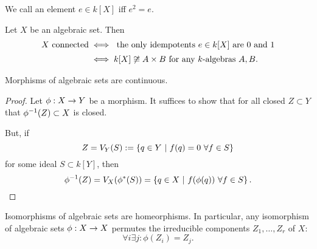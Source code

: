 \begin{lemma}
	We call an element $e \in k[X]$  iff $e^2 = e$.
	
	Let $X$ be an algebraic set. Then
	\begin{align*}
	X \text{ connected} &\iff \text{ the only idempotents }e \in k[X] \text{ are 0 and 1}\\
	&\iff k[X] \not\overset{}{\cong} A \times B \text{ for any }k\text{-algebras }A,B.
	\end{align*}
\end{lemma}
\begin{lemma}
	Morphisms of algebraic sets are continuous.
\end{lemma}
\begin{proof}
	Let $\phi : X \overset{}{\rightarrow} Y$ be a morphism.
	It suffices to show that for all closed $Z \subset Y$ that $\phi^{-1}(Z) \subset X$ is closed.
	
	But, if
	\[Z = V_Y(S) := \left\lbrace q \in Y ~ | ~ f(q) = 0 ~\forall f \in S\right\rbrace\]
	 for some ideal $S \subset k[Y]$, then 
	 \[\phi^{-1}(Z) = V_X(\phi^*(S)) = \left\lbrace q \in X ~ | ~ f ( \phi(q)) ~\forall f \in S\right\rbrace.\]
\end{proof}
\begin{lemma}
	Isomorphisms of algebraic sets are homeorphisms. In particular, any isomorphism of algebraic sets $\phi : X \overset{}{\rightarrow} X$ permutes the irreducible components $Z_1, \ldots, Z_r$ of $X$:
	\[ \forall i \exists j: \phi(Z_i) = Z_j. \]
\end{lemma}

